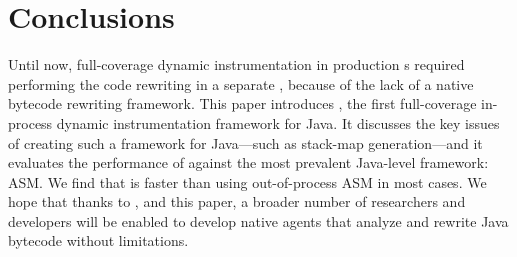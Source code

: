 \section{Conclusions}\label{sec:jnif-conclusions}

Until now,
full-coverage dynamic instrumentation in production \jvm{}s required performing the code rewriting in a separate \jvm{}, 
because of the lack of a native bytecode rewriting framework.
This paper introduces \jnif{}, the first full-coverage in-process dynamic instrumentation framework for Java.
It discusses the key issues of creating such a framework for Java---such as stack-map generation---and
it evaluates the performance of \jnif{} against the most prevalent Java-level framework: ASM.
We find that \jnif{} is faster than using out-of-process ASM in most cases.
We hope that thanks to \jnif{}, and this paper, a broader number of researchers and developers will
be enabled to develop native \jvm{} agents that analyze and rewrite Java bytecode without limitations.